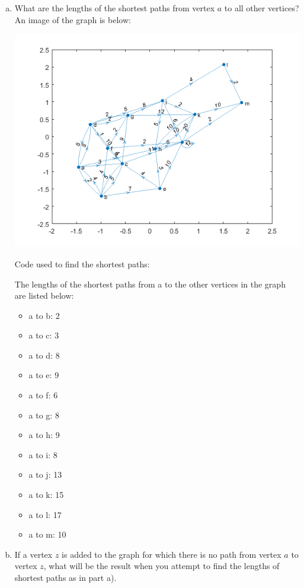 \documentclass[../report/main.tex]{subfiles}
\begin{document}
\begin{enumerate}[a)]
	\item What are the lengths of the shortest paths from vertex $a$ to all other vertices?
    An image of the graph is below:

    \includegraphics{../problem_three/problem3_digraph.png}

    Code used to find the shortest paths:
  
    

    The lengths of the shortest paths from a to the other vertices in the graph are listed below:
    \begin{itemize}
        \item a to b: 2
        \item a to c: 3
        \item a to d: 8
        \item a to e: 9
        \item a to f: 6
        \item a to g: 8
        \item a to h: 9
        \item a to i: 8
        \item a to j: 13
        \item a to k: 15
        \item a to l: 17
        \item a to m: 10
    \end{itemize}
	\item If a vertex $z$ is added to the graph for which there is no path from vertex $a$ to vertex $z$, what will be the result when you attempt to find the lengths of shortest paths as in part a).


\end{enumerate}
\end{document}
